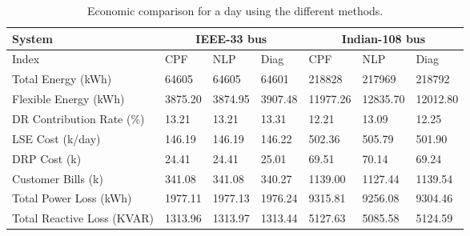 \documentclass[journal]{IEEEtran}
\begin{document}
\begin{table*}[bt!]
		\centering
	\renewcommand{\arraystretch}{1.3}
	\setlength\tabcolsep{6.0pt}
	\caption{Economic comparison for a day using the different methods.}
	\label{tab: Eco Comp 33 and 108-bus}
	\begin{tabular}{lllllll}
		\hline
		System                     & \multicolumn{3}{c}{IEEE-33 bus} & \multicolumn{3}{c}{Indian-108 bus} \\ \hline
		Index                      & CPF       & NLP      & Diag     & CPF        & NLP       & Diag      \\
		Total Energy (kWh)         & 64605     & 64605    & 64601    & 218828     & 217969    & 218792    \\
		Flexible Energy (kWh)      & 3875.20   & 3874.95  & 3907.48  & 11977.26   & 12835.70  & 12012.80  \\
		DR Contribution Rate (\%)      & 13.21     & 13.21    & 13.31    & 12.21      & 13.09     & 12.25     \\
		LSE Cost (\rupee k/day)          & 146.19    & 146.19   & 146.22   & 502.36     & 505.79    & 501.90    \\
		DRP Cost (\rupee k)              & 24.41     & 24.41    & 25.01    & 69.51      & 70.14     & 69.24     \\
		Customer    Bills (\rupee k)     & 341.08    & 341.08   & 340.27   & 1139.00    & 1127.44   & 1139.54   \\
		Total Power Loss (kWh)     & 1977.11   & 1977.13  & 1976.24  & 9315.81    & 9256.08   & 9304.46   \\
		Total Reactive Loss (KVAR) & 1313.96   & 1313.97  & 1313.44  & 5127.63    & 5085.58   & 5124.59  \\ \hline
	\end{tabular}
 \vspace{-2mm}
\end{table*}
\end{document}
